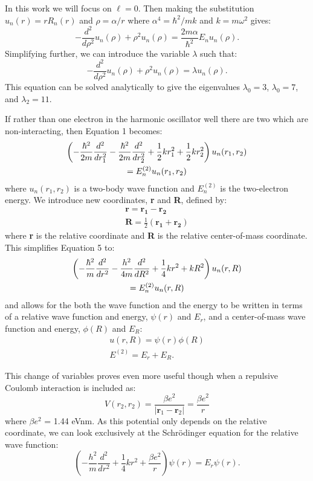 \documentclass[prc,amsmath,twocolumn,superscriptaddress]{revtex4}
\begin{document}
In this work we will focus on $\ell=0$. Then making the substitution $u_n(r)=rR_n(r)$ and $\rho=\alpha/r$ where $\alpha^4=\hbar^2/mk$ and $k=m\omega^2$ gives:
\begin{equation}
-\frac{d^2}{d\rho^2}u_n(\rho)+\rho^2u_n(\rho)=\frac{2m\alpha}{\hbar^2}E_{n}u_n(\rho).
\end{equation}
Simplifying further, we can introduce the variable $\lambda$ such that:
\begin{equation}
-\frac{d^2}{d\rho^2}u_n(\rho)+\rho^2u_n(\rho)=\lambda u_n(\rho).
\end{equation}
This equation can be solved analytically to give the eigenvalues $\lambda_0=3$, $\lambda_0=7$, and $\lambda_2=11$.

If rather than one electron in the harmonic oscillator well there are two which are non-interacting, then Equation 1 becomes:
\begin{gather}
\left(-\frac{\hbar^2}{2m}\frac{d^2}{dr_1^2}-\frac{\hbar^2}{2m}\frac{d^2}{dr_2^2}+\frac{1}{2}kr_1^2 +\frac{1}{2}kr_2^2 \right)u_n(r_1,r_2) \notag \\
= E_n^{(2)}u_n(r_1,r_2)
\end{gather}
where $u_n(r_1,r_2)$ is a two-body wave function and $E_n^{(2)}$ is the two-electron energy. We introduce new coordinates, \textbf{r} and \textbf{R}, defined by:
\begin{gather}
\mathbf{r}=\mathbf{r_1}-\mathbf{r_2} \\
\mathbf{R}=\frac{1}{2}\left(\mathbf{r_1}+\mathbf{r_2}\right) 
\end{gather}
where \textbf{r} is the relative coordinate and \textbf{R} is the relative center-of-mass coordinate. This simplifies Equation 5 to:
\begin{gather}
\left(-\frac{\hbar^2}{m}\frac{d^2}{dr^2}-\frac{h^2}{4m}\frac{d^2}{dR^2} + \frac{1}{4}kr^2+kR^2\right)u_n(r,R) \notag \\
=E_n^{(2)}u_n(r,R)
\end{gather}
and allows for the both the wave function and the energy to be written in terms of a relative wave function and energy, $\psi(r)$ and $E_r$, and a center-of-mass wave function and energy, $\phi(R)$ and $E_R$:
\begin{gather}
u(r,R)=\psi(r)\phi(R) \\
E^{(2)}=E_r+E_R.
\end{gather}

This change of variables proves even more useful though when a repulsive Coulomb interaction is included as:
\begin{equation}
V(r_2,r_2)=\frac{\beta e^2}{|\mathbf{r}_1-\mathbf{r}_2|}=\frac{\beta e^2}{r}
\end{equation}
where $\beta e^2$ = 1.44 eVnm. As this potential only depends on the relative coordinate, we can look exclusively at the Schr{\"o}dinger equation for the relative wave function:
\begin{equation}
\left(-\frac{h^2}{m}\frac{d^2}{dr^2}+\frac{1}{4}kr^2+\frac{\beta e^2}{r}\right)\psi(r)=E_r\psi(r).
\end{equation}
\end{document}
